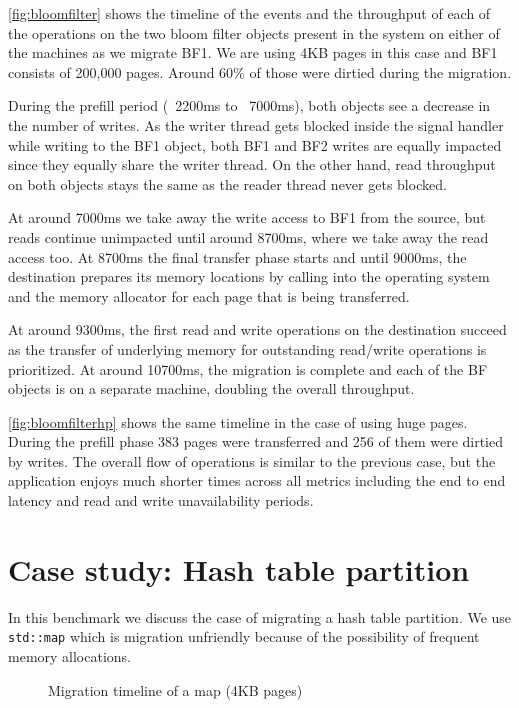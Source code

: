 \autoref{fig:bloomfilter} shows the timeline of the events and the throughput
of each of the operations on the two bloom filter objects present in the system
on either of the machines as we migrate BF1. We are using 4KB pages in this
case and BF1 consists of 200,000 pages. Around 60\% of those were dirtied during
the migration.

During the prefill period (~2200ms to ~7000ms), both objects see a decrease in
the number of writes. As the writer thread gets blocked inside the signal
handler while writing to the BF1 object, both BF1 and BF2 writes are equally
impacted since they equally share the writer thread. On the other hand, read
throughput on both objects stays the same as the reader thread never gets
blocked.

At around 7000ms we take away the write access to BF1 from the source, but
reads continue unimpacted until around 8700ms, where we take away the read
access too. At 8700ms the final transfer phase starts and until 9000ms,
the destination prepares its memory locations by calling into the operating
system and the memory allocator for each page that is being transferred.

At around 9300ms, the first read and write operations on the destination
succeed as the transfer of underlying memory for outstanding read/write
operations is prioritized. At around 10700ms, the migration is complete and
each of the BF objects is on a separate machine, doubling the overall
throughput.


\autoref{fig:bloomfilterhp} shows the same timeline in the case of using
huge pages. During the prefill phase 383 pages were transferred and
256 of them were dirtied by writes. The overall flow of operations is similar
to the previous case, but
the application enjoys much shorter times across all metrics including the
end to end latency and read and write unavailability periods.

\section{Case study: Hash table partition}
\label{sec:evalgenericobj}
In this benchmark we discuss the case of migrating a hash table partition. We
use \texttt{std::map} which is migration unfriendly because of the possibility
of frequent memory allocations.


\begin{figure}[tp]
    \begin{center}
        
    \end{center}
    \caption{Migration timeline of a map (4KB pages)}
    \label{fig:map}
\end{figure}

